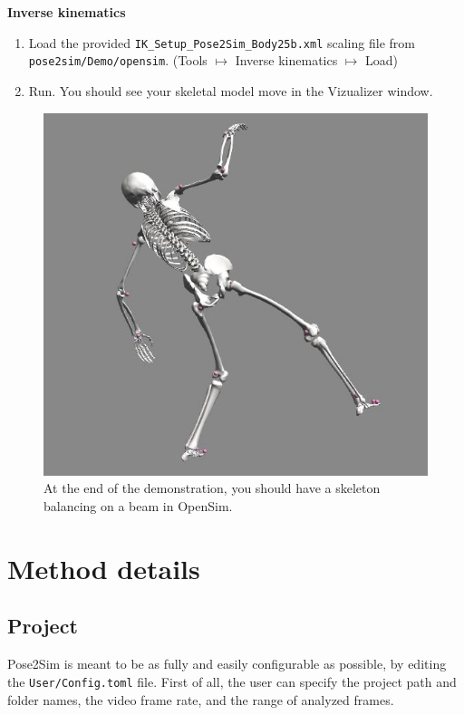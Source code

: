 \textbf{Inverse kinematics}
\begin{enumerate}[itemsep=0em, topsep=0em, leftmargin=*]
    \item Load the provided \texttt{IK_Setup_Pose2Sim_Body25b.xml} scaling file from \texttt{pose2sim/Demo/opensim}. (Tools $\mapsto$ Inverse kinematics $\mapsto$ Load)
    \item Run. You should see your skeletal model move in the Vizualizer window.
\end{enumerate}

\begin{figure}[hbtp]
	\centering
	\def\svgwidth{1\columnwidth}
	\fontsize{10pt}{10pt}\selectfont
	\includegraphics[width=\linewidth]{"../Chap3/Figures/Fig_OpenSimDemo.JPG"}
	\caption{At the end of the demonstration, you should have a skeleton balancing on a beam in OpenSim.}
	\label{fig_opensimdemo}
\end{figure}


\section{Method details}

\subsection{Project}
Pose2Sim is meant to be as fully and easily configurable as possible, by editing the \texttt{User/Config.toml} file. First of all, the user can specify the project path and folder names, the video frame rate, and the range of analyzed frames. 


